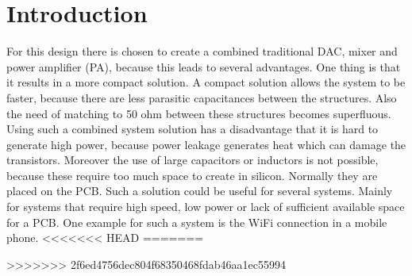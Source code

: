 \section{Introduction} \label{sec:introduction}
For this design there is chosen to create a combined traditional DAC, mixer and power amplifier (PA), because this leads to several advantages. One thing is that it results in a more compact solution. A compact solution allows the system to be faster, because there are less parasitic capacitances between the structures. Also the need of matching to 50 ohm between these structures becomes superfluous. Using such a combined system solution has a disadvantage that it is hard to generate high power, because power leakage generates heat which can damage the transistors. Moreover the use of large capacitors or inductors is not possible, because these require too much space to create in silicon. Normally they are placed on the PCB.
Such a solution could be useful for several systems. Mainly for systems that require high speed, low power or lack of sufficient available space for a PCB. One example for such a system is the WiFi connection in a mobile phone.
<<<<<<< HEAD
=======

>>>>>>> 2f6ed4756dec804f68350468fdab46aa1ec55994
